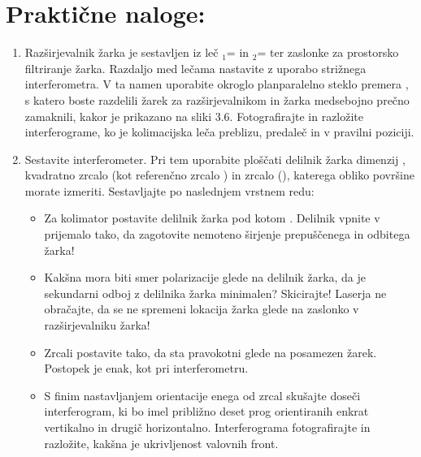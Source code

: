 \documentclass[letterpaper,10pt,english]{sphinxmanual}
\begin{document}
\section{Praktične naloge:}
\label{\detokenize{twyman_green:prakticne-naloge}}\begin{enumerate}
%
\item {} 
\sphinxAtStartPar
Razširjevalnik žarka je sestavljen iz leč $_{\text{1}}$=  in $_{\text{2}}$= \sphinxstyleemphasis{150 mm} ter zaslonke za prostorsko filtriranje žarka. Razdaljo med lečama nastavite z uporabo strižnega interferometra. V ta namen uporabite okroglo plan\sphinxhyphen{}paralelno steklo premera \sphinxstyleemphasis{40 mm}, s katero boste razdelili žarek za razširjevalnikom in žarka medsebojno prečno zamaknili, kakor je prikazano na sliki 3.6. Fotografirajte in razložite interferograme, ko je kolimacijska leča preblizu, predaleč in v pravilni poziciji.

\item {} 
\sphinxAtStartPar
Sestavite  interferometer. Pri tem uporabite ploščati delilnik žarka dimenzij , kvadratno zrcalo  (kot referenčno zrcalo \textendash{} ) in zrcalo (), katerega obliko površine morate izmeriti. Sestavljajte po naslednjem vrstnem redu:
\begin{itemize}
\item {} 
\sphinxAtStartPar
Za kolimator postavite delilnik žarka pod kotom . Delilnik vpnite v prijemalo tako, da zagotovite nemoteno širjenje prepuščenega in odbitega žarka!

\item {} 
\sphinxAtStartPar
Kakšna mora biti smer polarizacije glede na delilnik žarka, da je sekundarni odboj z delilnika žarka minimalen? Skicirajte! Laserja ne obračajte, da se ne spremeni lokacija žarka glede na zaslonko v razširjevalniku žarka!

\item {} 
\sphinxAtStartPar
Zrcali postavite tako, da sta pravokotni glede na posamezen žarek. Postopek je enak, kot pri  interferometru.

\item {} 
\sphinxAtStartPar
S finim nastavljanjem orientacije enega od zrcal skušajte doseči interferogram, ki bo imel približno deset prog orientiranih enkrat vertikalno in drugič horizontalno. Interferograma fotografirajte in razložite, kakšna je ukrivljenost valovnih front.


\end{itemize}
\end{enumerate}
\end{document}

